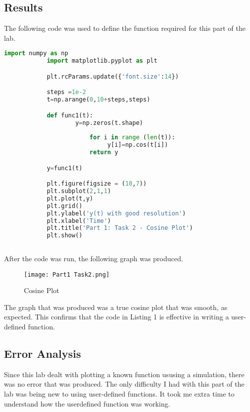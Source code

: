 \documentclass[12pt, titlepage]{article}
\begin{document}
            \subsection{Results}
            The following code was used to define the function required for this part of the lab.
            
            
            \lstset{language=Python}
            \lstset{frame=lines}
            \lstset{basicstyle=\footnotesize}
            \begin{lstlisting}[language=Python, caption=Part 1 Code]
            import numpy as np
            import matplotlib.pyplot as plt

            plt.rcParams.update({'font.size':14})

            steps =1e-2
            t=np.arange(0,10+steps,steps)

            def func1(t):
                    y=np.zeros(t.shape)
    
                        for i in range (len(t)):
                             y[i]=np.cos(t[i])
                        return y

            y=func1(t)

            plt.figure(figsize = (10,7))
            plt.subplot(2,1,1)
            plt.plot(t,y)
            plt.grid()
            plt.ylabel('y(t) with good resolution')
            plt.xlabel('Time')
            plt.title('Part 1: Task 2 - Cosine Plot')
            plt.show()
            
            \end{lstlisting}
            
            After the code was run, the following graph was produced.
            
            \begin{figure}[h!]
                \centering
                \texttt{[image: Part1 Task2.png]}
                \caption{Cosine Plot}
                \label{fig:my_label}
            \end{figure}
            
            The graph that was produced was a true cosine plot that was smooth, as expected.  This confirms that the code in Listing 1 is effective in writing a user-defined function. 
            
            \subsection{Error Analysis}
            Since this lab dealt with plotting a known function ususing a simulation, there was no error that was produced.  The only difficulty I had with this part of the lab was being new to using user-defined functions.  It took me extra time to understand how the userdefined function was working.
            
\end{document}

